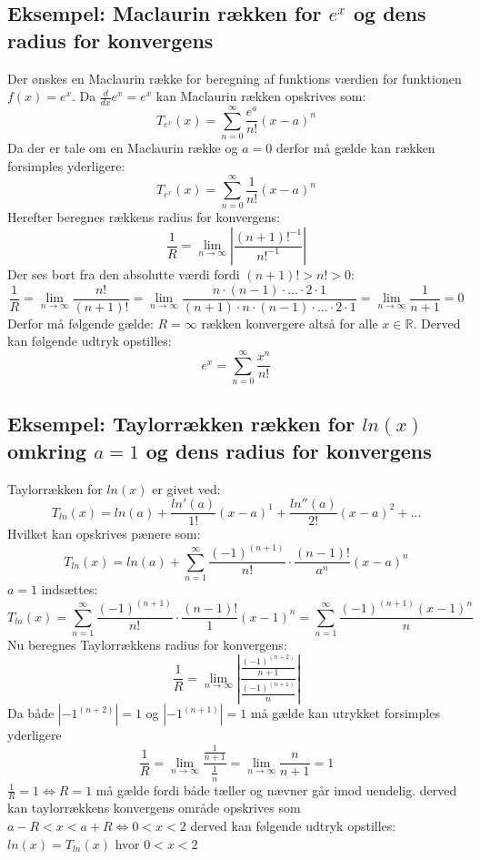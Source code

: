 \subsection*{\textbf{Eksempel:} Maclaurin rækken for $e^x$ og dens radius for konvergens} 
Der ønskes en Maclaurin række for beregning af funktions værdien for funktionen $f(x) = e^x$.
Da $\frac{d}{dx}e^x = e^x$ kan Maclaurin rækken opskrives som:
\[
    T_{e^x}(x) = \sum^\infty_{n = 0} \frac{e^a}{n!}(x-a)^n
\]
Da der er tale om en Maclaurin række og $a = 0$ derfor må gælde kan rækken forsimples yderligere:
\[
    T_{e^x}(x) = \sum^\infty_{n = 0} \frac{1}{n!}(x-a)^n
\]
Herefter beregnes rækkens radius for konvergens:
\[
    \frac{1}{R} = \lim_{n \rightarrow \infty} \left\lvert \frac{(n + 1)!^{-1}}{n!^{-1}} \right\lvert
\]
Der ses bort fra den absolutte værdi fordi $(n + 1)! > n! > 0$:
\[
    \frac{1}{R}= \lim_{n \rightarrow \infty} \frac{n!}{(n + 1)!} 
    = \lim_{n \rightarrow \infty} \frac{n \cdot (n-1) \cdot \ldots \cdot 2 \cdot 1}{(n + 1) \cdot n \cdot (n-1) \cdot \ldots \cdot 2 \cdot 1}
    = \lim_{n \rightarrow \infty} \frac{1}{n + 1} = 0
\]
Derfor må følgende gælde: $R = \infty$ rækken konvergere altså for alle $x \in \mathbb{R}$.
Derved kan følgende udtryk opstilles:
\[
    e^x = \sum^\infty_{n = 0} \frac{x^n}{n!}  
\]
\subsection*{\textbf{Eksempel:} Taylorrækken rækken for $ln(x)$ omkring $a = 1$ og dens radius for konvergens} %
Taylorrækken for $ln(x)$ er givet ved:
\[
    T_{ln}(x) = ln(a) + \frac{ln'(a)}{1!}(x-a)^1 + \frac{ln''(a)}{2!}(x-a)^2 + \ldots
\]
Hvilket kan opskrives pænere som:
\[
    T_{ln}(x) = ln(a) + \sum^{\infty}_{n = 1} \frac{(-1)^{(n+1)}}{n!} \cdot \frac{(n-1)!}{a^n} (x-a)^{n}
\]
$a = 1$ indsættes:
\[
    T_{ln}(x) = \sum^{\infty}_{n = 1} \frac{(-1)^{(n+1)}}{n!} \cdot \frac{(n-1)!}{1} (x-1)^{n}
    = \sum^{\infty}_{n = 1} \frac{(-1)^{(n+1)}(x-1)^{n}}{n}
\]
Nu beregnes Taylorrækkens radius for konvergens: 
\[
    \frac{1}{R} = \lim_{n \rightarrow \infty} \left\lvert \frac{\frac{(-1)^{(n+2)}}{n+1}}{\frac{(-1)^{(n+1)}}{n}} \right\lvert
\]
Da både $\left\lvert -1^{(n+2)} \right\lvert = 1$ og $\left\lvert-1^{(n + 1)} \right\lvert = 1$ må gælde kan utrykket forsimples yderligere
\[
    \frac{1}{R} = \lim_{n \rightarrow \infty} \frac{\frac{1}{n+1}}{\frac{1}{n}} = \lim_{n \rightarrow \infty} \frac{n}{n+1} = 1
\]
$\frac{1}{R} = 1 \Leftrightarrow R = 1$ må gælde fordi både tæller og nævner går imod uendelig. 
derved kan taylorrækkens konvergens område opskrives som $a-R < x < a+R \Leftrightarrow 0 < x < 2$ 
derved kan følgende udtryk opstilles: $ln(x) = T_{ln}(x)$ hvor $ 0 < x < 2$
